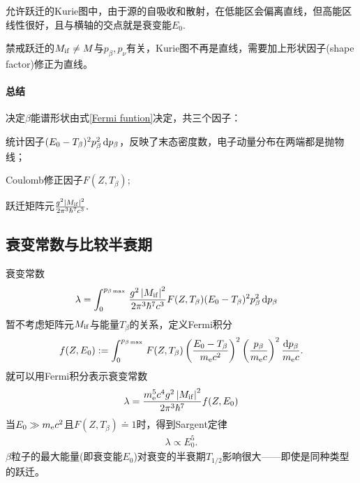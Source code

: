 允许跃迁的Kurie图中，由于源的自吸收和散射，在低能区会偏离直线，但高能区线性很好，且与横轴的交点就是衰变能$E_0.$

禁戒跃迁的$M_{\mathrm{i}\mathrm{f}}\neq M$与$p_\beta,p_\nu$有关，Kurie图不再是直线，需要加上形状因子(shape factor)修正为直线。
\paragraph{总结}决定$\beta$能谱形状由式\eqref{Fermi funtion}决定，共三个因子：
\begin{compactenum}
	\item 统计因子$(E_0-T_\beta)^2p_\beta^2\mathop{}\!\mathrm{d} p_\beta$，反映了末态密度数，电子动量分布在两端都是抛物线；
	\item Coulomb修正因子$F(Z,T_\beta)$;
	\item 跃迁矩阵元$\frac{g^2\left\lvert M_{\mathrm{i}\mathrm{f}}\right\rvert^2}{2\pi^3\hbar^7c^3}.$
\end{compactenum}

\subsection{衰变常数与比较半衰期}

衰变常数
\begin{align*}
	\lambda&=\int_0^{p_{\beta\max{}}}\frac{g^2\left\lvert M_{\mathrm{i}\mathrm{f}}\right\rvert^2}{2\pi^3\hbar^7c^3}F(Z,T_\beta)(E_0-T_\beta)^2p_\beta^2\mathop{}\!\mathrm{d} p_\beta
\end{align*}
暂不考虑矩阵元$M_{\mathrm{i}\mathrm{f}}$与能量$T_\beta$的关系，定义Fermi积分
\begin{align}
	f(Z,E_0):=\int_0^{p_{\beta\max{}}}F(Z,T_\beta)\left(\frac{E_0-T_\beta}{m_\mathrm e c^2}\right)^2\left(\frac{p_\beta}{m_\mathrm e c}\right)^2\frac{\mathop{}\!\mathrm{d} p_\beta}{m_\mathrm e c}.
\end{align}
就可以用Fermi积分表示衰变常数
\[
	\lambda=\frac{m_\mathrm e^5c^4g^2\left\lvert M_{\mathrm{i}\mathrm{f}}\right\rvert^2}{2\pi^3\hbar^7}f(Z,E_0)
\]
当$E_0\gg m_\mathrm e c^2$且$F(Z,T_\beta)\doteq 1$时，得到Sargent定律
\begin{align}
	\lambda\propto E_0^5.
\end{align}
$\beta$粒子的最大能量(即衰变能$E_0$)对衰变的半衰期$T_{1/2}$影响很大——即使是同种类型的跃迁。

